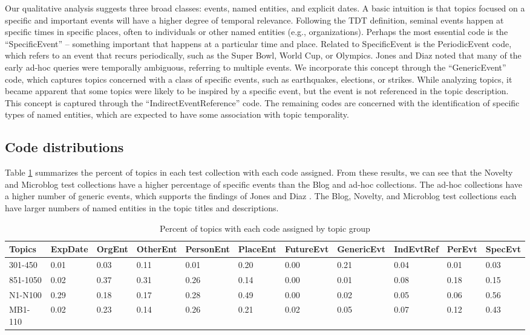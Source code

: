 \documentclass{sig-alternate}
\begin{document}
Our qualitative analysis suggests three broad classes: events, named entities, and explicit dates. A basic intuition is that topics focused on a specific and important events will have a higher degree of temporal relevance. Following the TDT definition, seminal events happen at specific times in specific places, often to individuals or other named entities (e.g., organizations). Perhaps the most essential code is the ``SpecificEvent'' -- something important that happens at a particular time and place. Related to SpecificEvent is the PeriodicEvent code, which refers to an event that recurs periodically, such as the Super Bowl, World Cup, or Olympics. Jones and Diaz \cite{Jones2007} noted that many of the early ad-hoc queries were temporally ambiguous, referring to multiple events. We incorporate this concept through the ``GenericEvent'' code, which captures topics concerned with a class of specific events, such as earthquakes, elections, or strikes. While analyzing topics, it became apparent that some topics were likely to be inspired by a specific event, but the event is not referenced in the topic description. This concept is captured through the ``IndirectEventReference'' code. The remaining codes are concerned with the identification of specific types of named entities, which are expected to have some  association with topic temporality.


\subsection{Code distributions}

Table \ref{table.codedist} summarizes the percent of topics in each test collection with each code assigned. From these results, we can see that the Novelty and Microblog test collections have a higher percentage of specific events than the Blog and ad-hoc collections. The ad-hoc collections have a higher number of generic events, which supports the findings of Jones and Diaz \cite{Jones2007}. The Blog, Novelty, and Microblog test collections each have larger numbers of named entities in the topic titles and descriptions.

\begin{table}
\small
\begin{tabular}{| l | l | l | l | l | l | l | l | l | l | l |} \hline
Topics & ExpDate &	OrgEnt&	OtherEnt&	PersonEnt&	PlaceEnt&	FutureEvt&	GenericEvt&	IndEvtRef &	PerEvt&	SpecEvt \\ \hline
301-450	&	0.01&	0.03&	0.11&	0.01&	0.20&	0.00&	0.21&	0.04&	0.01&	0.03 \\ \hline
851-1050	&	0.02&	0.37&	0.31&	0.26&	0.14&	0.00&	0.01&	0.08&	0.18&	0.15 \\ \hline
N1-N100	&	0.29&	0.18&	0.17&	0.28&	0.49&	0.00&	0.02&	0.05&	0.06&	0.56 \\ \hline
MB1-110	&	0.02&	0.23&	0.14&	0.26&	0.21&	0.02&	0.05&	0.07&	0.12&	0.43 \\ \hline
\end{tabular}
\caption{Percent of topics with each code assigned by topic group}
\label{table.codedist}
\end{table}
\end{document}
